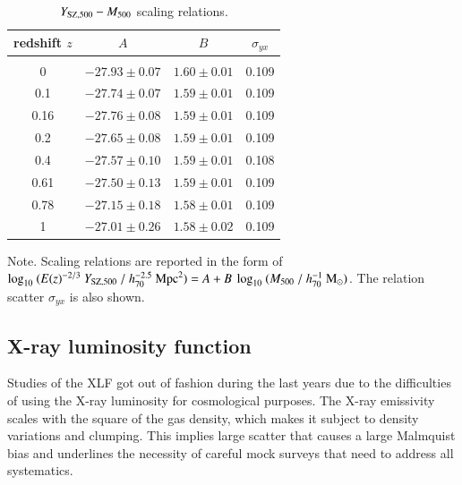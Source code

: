 \documentclass[useAMS,usenatbib]{mn2e}
\begin{document}
\begin{table} 
\begin{center}
\caption{$Y_{{\mathrm{SZ}}, 500}-M_{500}$ scaling relations.}
\medskip
\begin{tabular}{cccc}
\hline
\phantom{\Big|}
redshift $z$ & $A$ & $B$ & $\sigma_{yx}$ \\
\hline\\[-0.5em]
 0      & $-27.93\pm0.07$ & $1.60\pm0.01$ & 0.109\\
 0.1   & $-27.74\pm0.07$ & $1.59\pm0.01$ & 0.109\\
 0.16 & $-27.76\pm0.08$ & $1.59\pm0.01$ & 0.109\\
 0.2   & $-27.65\pm0.08$ & $1.59\pm0.01$ & 0.109\\ 
 0.4   & $-27.57\pm0.10$ & $1.59\pm0.01$ & 0.108\\ 
 0.61 & $-27.50\pm0.13$ & $1.59\pm0.01$ & 0.109\\ 
 0.78 & $-27.15\pm0.18$ & $1.58\pm0.01$ & 0.109\\ 
 1      & $-27.01\pm0.26$ & $1.58\pm0.02$ & 0.109\\[0.5em] 
\hline
\end{tabular}
\label{tab:YSZfits}
\end{center}
\footnotesize{Note. Scaling relations are reported in the form of $\log_{10}~(E(z)^{-2/3}~Y_{{\mathrm{SZ}},500}~/~h_{70}^{-2.5}~{\mathrm{Mpc}}^{2})=A+B~\log_{10}~(M_{500}~/~h_{70}^{-1}~{\mathrm{M_{\odot}}})$. The relation scatter $\sigma_{yx}$ is also shown.}
\end{table}



\subsection{X-ray luminosity function}

Studies of the XLF got out of fashion during the last years due to the
difficulties of using the X-ray luminosity for cosmological purposes. The X-ray
emissivity scales with the square of the gas density, which makes it subject to
density variations and clumping. This implies large scatter that causes a large
Malmquist bias and underlines the necessity of careful mock surveys that need to
address all systematics.
\end{document}
